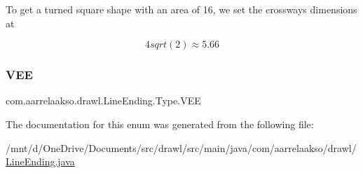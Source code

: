 To get a turned square shape with an area of 16, we set the crossways dimensions at

\[4 sqrt(2) \approx 5.66\] \mbox{\label{enumcom_1_1aarrelaakso_1_1drawl_1_1_line_ending_1_1_type_a19cae46d0b7da7cea3da79f650474a98}} 
\subsubsection{\texorpdfstring{V\+EE}{VEE}}
{\footnotesize\ttfamily com.\+aarrelaakso.\+drawl.\+Line\+Ending.\+Type.\+V\+EE}



The documentation for this enum was generated from the following file\+:\begin{DoxyCompactItemize}
\item 
/mnt/d/\+One\+Drive/\+Documents/src/drawl/src/main/java/com/aarrelaakso/drawl/\hyperlink{_line_ending_8java}{Line\+Ending.\+java}\end{DoxyCompactItemize}
